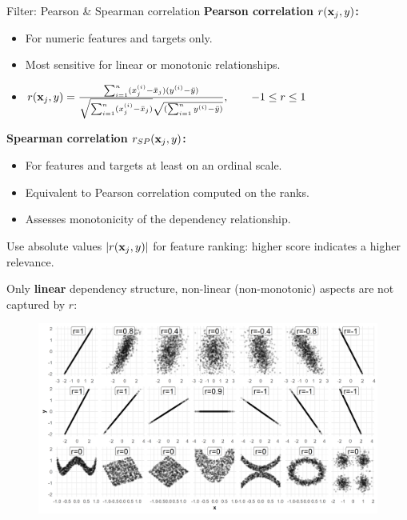 \begin{vbframe}{Filter: Pearson \& Spearman correlation}
\textbf{Pearson correlation $r(\mathbf{x}_j, y)$: }
\begin{itemize}
  \item For numeric features and targets only.
  \item Most sensitive for linear or monotonic relationships.
  \item $ r(\mathbf{x}_j, y) = \frac{\sum_{i=1}^n (x^{(i)}_j - \bar{x}_j) (y^{(i)} - \bar{y})}{\sqrt{\sum_{i=1}^n (x^{(i)}_j - \bar{x}_j)} \sqrt{(\sum_{i=1}^n y^{(i)} - \bar{y})}},\qquad -1 \le r \le 1$
\end{itemize}
\textbf{Spearman correlation $r_{SP}(\mathbf{x}_j, y)$:}
\begin{itemize}
  \item For features and targets at least on an ordinal scale.
  \item Equivalent to Pearson correlation computed on the ranks.
  \item Assesses monotonicity of the dependency relationship.
\end{itemize}
\lz
Use absolute values $|r(\mathbf{x}_j, y)|$ for feature ranking: higher score indicates a higher relevance.

\framebreak

Only \textbf{linear} dependency structure, non-linear (non-monotonic) aspects are not captured by $r$:

\lz

\begin{figure}
  \includegraphics {figure_man/chunk2_filter_correlation.png}
\end{figure}


\end{vbframe}
